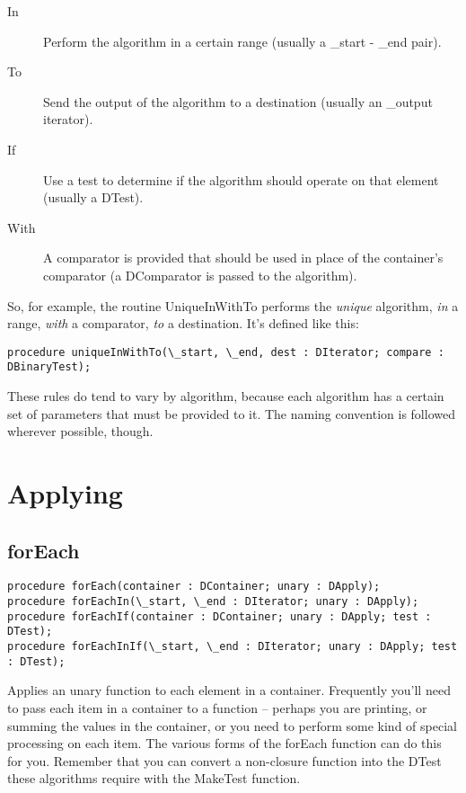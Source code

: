 \documentclass{report}
\begin{document}
\begin{description}
\item[In] Perform the algorithm in a certain range (usually 
a \_start - \_end pair).

\item[To]  Send the output of the algorithm to a destination 
(usually an \_output iterator).

\item[If] Use a test to determine if the algorithm should 
operate on that element (usually a DTest).

\item[With] A comparator is provided that should be used 
in place of the container's comparator (a DComparator is passed to the 
algorithm).
\end{description}

So, for example, the routine UniqueInWithTo performs the \emph{unique}
algorithm, \emph{in} a range, \emph{with} a comparator, \emph{to}
 a destination. It's defined like this:

\lstinline|procedure uniqueInWithTo(\_start, \_end, dest : DIterator; compare : DBinaryTest);|

These rules do tend to vary by algorithm, because each algorithm has a
certain set of parameters that must be provided to it. The naming convention
is followed wherever possible, though.

\section{Applying}

\subsection{forEach}

\begin{lstlisting}
procedure forEach(container : DContainer; unary : DApply);
procedure forEachIn(\_start, \_end : DIterator; unary : DApply);
procedure forEachIf(container : DContainer; unary : DApply; test : DTest);
procedure forEachInIf(\_start, \_end : DIterator; unary : DApply; test : DTest);
\end{lstlisting}

Applies an unary function to each element in a container.  Frequently you'll
need to pass each item in a container to a function -- perhaps you are
printing, or summing the values in the container, or you need to perform
some kind of special processing on each item. The various forms of the
forEach function can do this for you. Remember that you can convert a
non-closure function into the DTest these algorithms require with the
MakeTest function.
\end{document}

